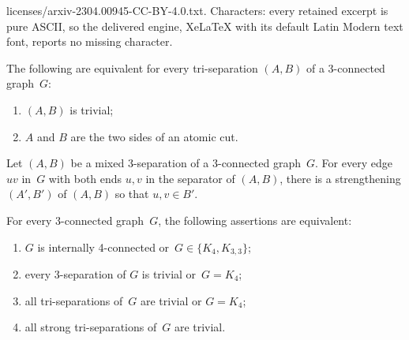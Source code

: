 \documentclass[10pt,a4paper]{amsart}
\begin{document}
licenses/arxiv-2304.00945-CC-BY-4.0.txt. Characters: every retained excerpt is pure ASCII, so the delivered engine, XeLaTeX with its default Latin Modern text font, reports no missing character.
\begin{lem}\label{trivial}
The following are equivalent for every tri-separation $(A,B)$ of a 3-connected graph~$G$:
 \begin{enumerate}
  \item $(A,B)$ is trivial;
  \item $A$ and $B$ are the two sides of an atomic cut.
 \end{enumerate}
\end{lem}

\begin{lem}\label{reduceToStrong}
Let $(A,B)$ be a mixed 3-separation of a 3-connected graph~$G$.
For every edge $uv$ in~$G$ with both ends $u,v$ in the separator of $(A,B)$,
there is a strengthening $(A',B')$ of $(A,B)$ so that $u,v\in B'$.
\end{lem}

\begin{prop}\label{tetraXtrisep}
For every 3-connected graph~$G$, the following assertions are equivalent:
\begin{enumerate}
    \item\label{ItemTetra} $G$ is internally 4-connected or~$G\in\{K_4,K_{3,3}\}$;
        \item\label{ItemTetra_neu} every 3-separation of $G$ is trivial or~$G=K_4$;
        \item\label{ItemTrivial1} all tri-separations of~$G$ are trivial or $G=K_4$;
    \item\label{ItemTrivial2} all strong tri-separations of~$G$ are trivial.
\end{enumerate}
\end{prop}
\end{document}
